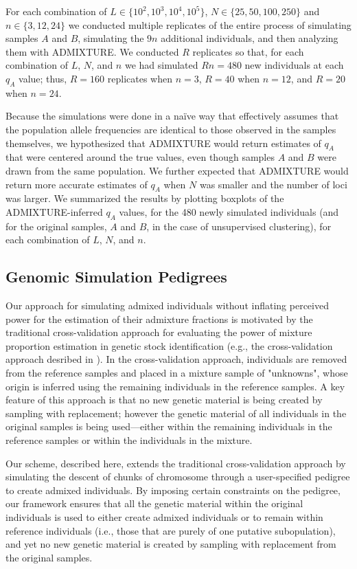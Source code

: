 For each combination of $L \in \{10^2, 10^3, 10^4, 10^5\}$,
$N \in \{25, 50, 100, 250\}$ and $n\in\{3,12,24\}$ we conducted multiple replicates
of the entire process of
simulating samples $A$ and $B$, simulating the $9n$ additional individuals, and
then analyzing them with ADMIXTURE.  We conducted $R$ replicates so that,
for each combination of $L$, $N$, and $n$ we had simulated $Rn=480$ new individuals
at each $q_A$ value; thus, $R=160$ replicates when $n = 3$, $R=40$ when $n=12$, and
$R=20$ when $n=24$.


Because the simulations were done in a na\"{i}ve way that effectively assumes that the population
allele frequencies are identical to those observed in the samples themselves, we hypothesized that ADMIXTURE would return estimates of 
$q_A$ that were
centered around the true values, even though samples $A$ and $B$ were drawn from the same
population.
We further expected that ADMIXTURE would return more accurate estimates of
$q_A$ when $N$ was smaller and the number of loci was larger.
We summarized the results by plotting boxplots of the ADMIXTURE-inferred $q_A$ values,
 for the 480 newly simulated individuals (and for the original samples, $A$ and $B$, in the
 case of unsupervised clustering),
for each combination of $L$, $N$, and $n$.




\subsection*{Genomic Simulation Pedigrees}

Our approach for simulating admixed individuals without inflating perceived power for
the estimation of their admixture fractions is motivated by the traditional cross-validation
approach for evaluating the power of mixture proportion
estimation in genetic stock identification (e.g., the cross-validation approach
desribed in \citealt{moran2019bayesian}).
In the cross-validation approach, individuals are removed from the reference
samples and placed in a mixture sample of "unknowns", whose origin
is inferred using the remaining individuals in the reference samples.  A key
feature of this approach is that no new genetic material is being created by
sampling with replacement; however the genetic material of all individuals
in the original samples is being used---either within the remaining individuals in the
reference samples or within the individuals in the mixture.

Our scheme, described here, extends the traditional cross-validation approach
by simulating the descent of chunks of chromosome through a user-specified
pedigree to create admixed individuals.  By imposing certain constraints
on the pedigree, our framework ensures that all the genetic material
within the original individuals is used to either create admixed individuals or to
remain within reference individuals (i.e., those that are purely of one
putative subopulation), and yet no new genetic material is
created by sampling with replacement from the original samples.

